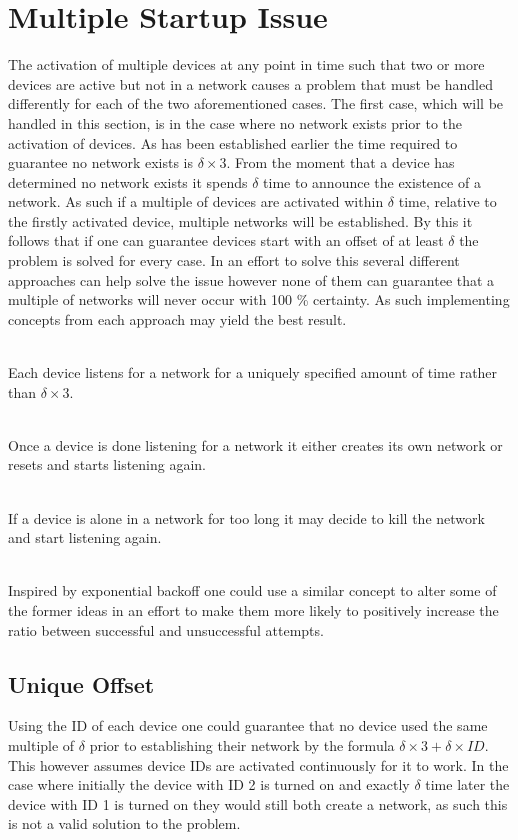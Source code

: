 \section{Multiple Startup Issue}\label{sec:MSI-CCRC}
The activation of multiple devices at any point in time such that two or more devices are active but not in a network causes a problem that must be handled differently for each of the two aforementioned cases.
The first case, which will be handled in this section, is in the case where no network exists prior to the activation of devices.
As has been established earlier the time required to guarantee no network exists is $\delta \times 3$.
From the moment that a device has determined no network exists it spends $\delta$ time to announce the existence of a network.
As such if a multiple of devices are activated within $\delta$ time, relative to the firstly activated device, multiple networks will be established.
By this it follows that if one can guarantee devices start with an offset of at least $\delta$ the problem is solved for every case.
In an effort to solve this several different approaches can help solve the issue however none of them can guarantee that a multiple of networks will never occur with 100 \% certainty. 
As such implementing concepts from each approach may yield the best result.

\begin{description}[labelindent=\parindent]
    \item[Unique Offset]\hfill\\
    Each device listens for a network for a uniquely specified amount of time rather than $\delta \times 3$.
    \item[Randomly Create]\hfill\\
    Once a device is done listening for a network it either creates its own network or resets and starts listening again.
    \item[Kill the Network]\hfill\\
    If a device is alone in a network for too long it may decide to kill the network and start listening again.
    \item[Exponential Backoff]\hfill\\ 
    Inspired by exponential backoff one could use a similar concept to alter some of the former ideas in an effort to make them more likely to positively increase the ratio between successful and unsuccessful attempts.
\end{description} 

\subsection{Unique Offset}
Using the ID of each device one could guarantee that no device used the same multiple of $\delta$ prior to establishing their network by the formula $\delta \times 3 + \delta \times ID$.
This however assumes device IDs are activated continuously for it to work.
In the case where initially the device with ID 2 is turned on and exactly $\delta$ time later the device with ID 1 is turned on they would still both create a network, as such this is not a valid solution to the problem.

